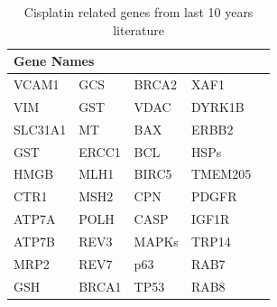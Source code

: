  \begin{table}[htbp]
   \centering
   \caption{Cisplatin related genes from last 10 years literature}
     \begin{tabular}{|l|l|l|l|r}
     
     \hline
     \multicolumn{4}{|l|}{Gene Names}  \\
     \hline
     
     VCAM1  & GCS    & BRCA2  & XAF1    \\
     VIM    & GST    & VDAC   & DYRK1B  \\
     SLC31A1 & MT     & BAX    & ERBB2 \\
     GST    & ERCC1  & BCL    & HSPs   \\
     HMGB   & MLH1   & BIRC5  & TMEM205 \\
     CTR1   & MSH2   & CPN    & PDGFR \\
     ATP7A  & POLH   & CASP   & IGF1R  \\
     ATP7B  & REV3   & MAPKs  & TRP14  \\
     MRP2   & REV7   & p63    & RAB7   \\
     GSH    & BRCA1  & TP53   & RAB8   \\
     \hline
     \end{tabular}%
   \label{tab:Cisplatinrelatedgenes}%
 \end{table}
 
 
 
